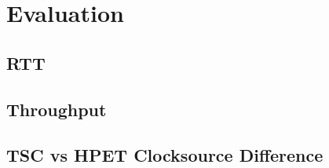 \chapter{Evaluation}



\section{RTT}

\section{Throughput}


\section{TSC vs HPET Clocksource Difference}
